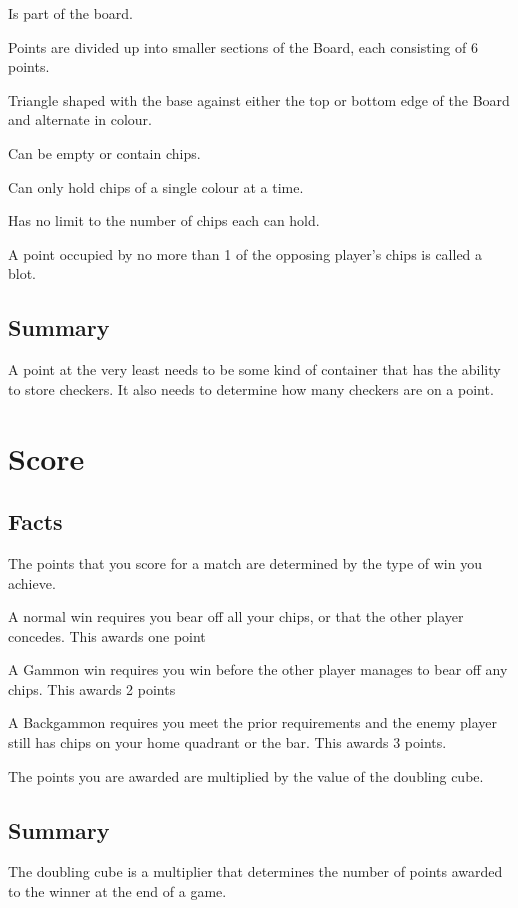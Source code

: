 \documentclass{report}
\begin{document}
    \begin{dashed}
        \item Is part of the board.
        \item Points are divided up into smaller sections of the Board, each consisting of 6 points.
        \item Triangle shaped with the base against either the top or bottom edge of the Board and alternate in colour.
        \item Can be empty or contain chips.
        \item Can only hold chips of a single colour at a time.
        \item Has no limit to the number of chips each can hold.
        \item A point occupied by no more than 1 of the opposing player’s chips is called a blot.
    \end{dashed}


    \subsection{Summary}

    A point at the very least needs to be some kind of container that has the ability
    to store checkers. It also needs to determine how many checkers are on a point.





    \newpage
    \section{Score}

    \subsection{Facts}

    \begin{dashed}
        \item The points that you score for a match are determined by the type of win you achieve.
        \item A normal win requires you bear off all your chips, or that the other player concedes. This    awards one point
        \item A Gammon win requires you win before the other player manages to bear off any chips. This awards 2 points
        \item A Backgammon requires you meet the prior requirements and the enemy player still has chips on your home quadrant or the bar. This awards 3 points.
        \item The points you are awarded are multiplied by the value of the doubling cube.
    \end{dashed}

    \subsection{Summary}
    The doubling cube is a multiplier that determines the number of points awarded
    to the winner at the end of a game.
\end{document}
